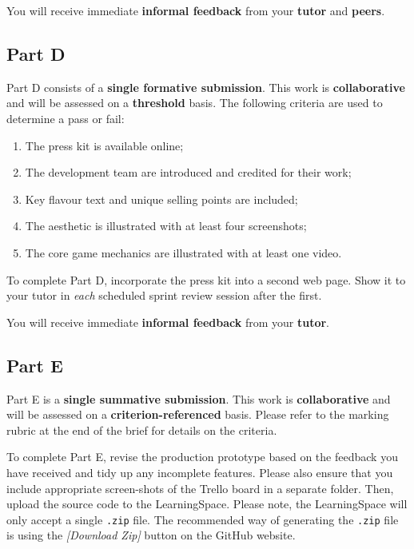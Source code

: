 \documentclass{../fal_assignment}
\begin{document}
You will receive immediate \textbf{informal feedback} from your \textbf{tutor} and \textbf{peers}.

\subsection*{Part D}

Part D consists of a \textbf{single formative submission}. This work is \textbf{collaborative} and will be assessed on a \textbf{threshold} basis. The following criteria are used to determine a pass or fail:

\begin{enumerate}[label=(\alph*)]
	\item The press kit is available online;
	\item The development team are introduced and credited for their work;
	\item Key flavour text and unique selling points are included;
	\item The aesthetic is illustrated with at least four screenshots;
	\item The core game mechanics are illustrated with at least one video.
\end{enumerate}

To complete Part D, incorporate the press kit into a second web page. Show it to your tutor in \textit{each} scheduled sprint review session after the first.

You will receive immediate \textbf{informal feedback} from your \textbf{tutor}.

\subsection*{Part E}

Part E is a \textbf{single summative submission}. This work is \textbf{collaborative} and will be assessed on a \textbf{criterion-referenced} basis. Please refer to the marking rubric at the end of the brief for details on the criteria.

To complete Part E, revise the production prototype based on the feedback you have received and tidy up any incomplete features. Please also ensure that you include appropriate screen-shots of the Trello board in a separate folder. Then, upload the source code to the LearningSpace. Please note, the LearningSpace will only accept a single \texttt{.zip} file. The recommended way of generating the \texttt{.zip} file is using the \textit{[Download Zip]} button on the GitHub website.
\end{document}
